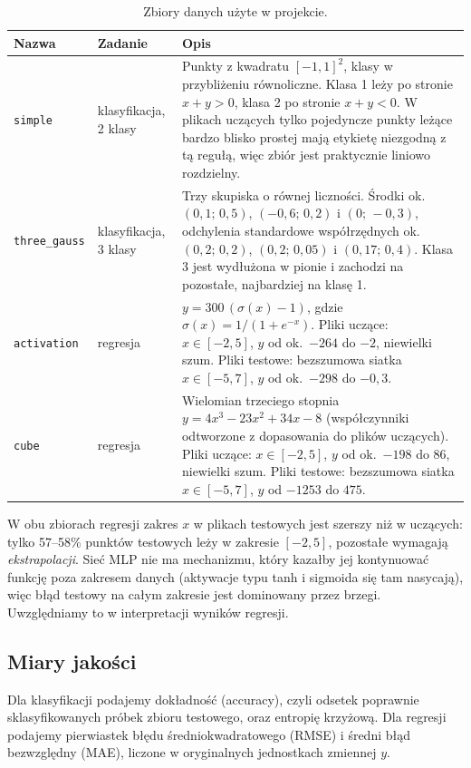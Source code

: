 \documentclass[11pt,a4paper]{article}
\begin{document}
	\begin{table}[H]
		\centering
		\caption{Zbiory danych użyte w projekcie.}\label{tab:datasets}
		\begin{tabular}{@{}llp{8.2cm}@{}}
			\toprule
			Nazwa & Zadanie & Opis \\
			\midrule
			\texttt{simple} & klasyfikacja, 2 klasy &
			Punkty z kwadratu $[-1,1]^2$, klasy w przybliżeniu równoliczne. Klasa 1 leży po stronie $x+y>0$, klasa 2 po stronie $x+y<0$. W plikach uczących tylko pojedyncze punkty leżące bardzo blisko prostej mają etykietę niezgodną z tą regułą, więc zbiór jest praktycznie liniowo rozdzielny.\\
			\texttt{three\_gauss} & klasyfikacja, 3 klasy &
			Trzy skupiska o równej liczności. Środki ok. $(0{,}1;\,0{,}5)$, $(-0{,}6;\,0{,}2)$ i $(0;\,-0{,}3)$, odchylenia standardowe współrzędnych ok. $(0{,}2;\,0{,}2)$, $(0{,}2;\,0{,}05)$ i $(0{,}17;\,0{,}4)$. Klasa 3 jest wydłużona w pionie i zachodzi na pozostałe, najbardziej na klasę 1.\\
			\texttt{activation} & regresja &
			$y=300\,(\sigma(x)-1)$, gdzie $\sigma(x)=1/(1+e^{-x})$. Pliki uczące: $x\in[-2,5]$, $y$ od ok.\ $-264$ do $-2$, niewielki szum. Pliki testowe:  bezszumowa siatka $x\in[-5,7]$, $y$ od ok.\ $-298$ do $-0{,}3$.\\
			\texttt{cube} & regresja &
			Wielomian trzeciego stopnia $y=4x^3-23x^2+34x-8$ (współczynniki odtworzone z dopasowania do plików uczących). Pliki uczące: $x\in[-2,5]$, $y$ od ok.\ $-198$ do $86$, niewielki szum. Pliki testowe: bezszumowa siatka $x\in[-5,7]$, $y$ od $-1253$ do $475$.\\
			\bottomrule
		\end{tabular}
	\end{table}
	
	W obu zbiorach regresji zakres $x$ w plikach testowych jest szerszy niż w uczących: tylko 57--58\% punktów testowych leży w zakresie $[-2,5]$, pozostałe wymagają \emph{ekstrapolacji}. Sieć MLP nie ma mechanizmu, który kazałby jej kontynuować funkcję poza zakresem danych (aktywacje typu tanh i sigmoida się tam nasycają), więc błąd testowy na całym zakresie jest dominowany przez brzegi. Uwzględniamy to w interpretacji wyników regresji.
	
	\subsection{Miary jakości}
	Dla klasyfikacji podajemy dokładność (accuracy), czyli odsetek poprawnie sklasyfikowanych próbek zbioru testowego, oraz entropię krzyżową. Dla regresji podajemy pierwiastek błędu średniokwadratowego (RMSE) i średni błąd bezwzględny (MAE), liczone w oryginalnych jednostkach zmiennej $y$.
	
\end{document}
